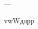 \documentclass[12pt,a6paper,twoside,dvips,civil=antiqua,cs=irmologion]{hipbook}
\begin{document}
---

v\г w\т W\т д\с л\д р\с р\д
\end{document}

